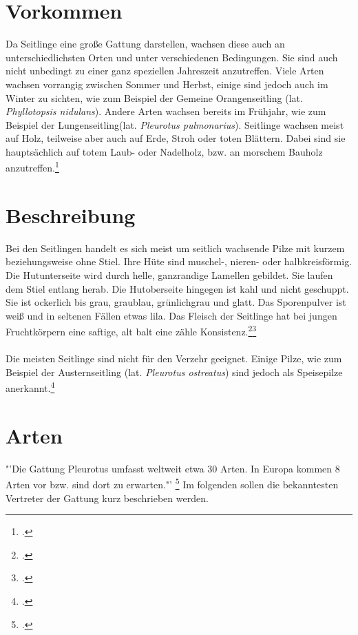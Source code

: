 \documentclass[a4paper,abstracton]{scrreprt}
\begin{document}
\section{Vorkommen}
Da Seitlinge eine große Gattung darstellen, wachsen diese auch an unterschiedlichsten Orten und unter verschiedenen Bedingungen. Sie sind auch nicht unbedingt zu einer ganz speziellen Jahreszeit anzutreffen. Viele Arten wachsen vorrangig zwischen Sommer und Herbst, einige sind jedoch auch im Winter zu sichten, wie zum Beispiel der Gemeine Orangenseitling (lat. \emph{Phyllotopsis nidulans}). Andere Arten wachsen bereits im Frühjahr, wie zum Beispiel der Lungenseitling(lat. \emph{Pleurotus pulmonarius}). Seitlinge wachsen meist auf Holz, teilweise aber auch auf Erde, Stroh oder toten Blättern. Dabei sind sie hauptsächlich auf totem Laub- oder Nadelholz, bzw. an morschem Bauholz anzutreffen.\footcite{pilzech}

\section{Beschreibung}
Bei den Seitlingen handelt es sich meist um seitlich wachsende Pilze mit kurzem beziehungsweise ohne Stiel. Ihre Hüte sind muschel-, nieren- oder halbkreisförmig. Die Hutunterseite wird durch helle, ganzrandige Lamellen gebildet. Sie laufen dem Stiel entlang herab. Die Hutoberseite hingegen ist kahl und nicht geschuppt. Sie ist ockerlich bis grau, graublau, grünlichgrau und glatt. Das Sporenpulver ist weiß und in seltenen Fällen etwas lila. Das Fleisch der Seitlinge hat bei jungen Fruchtkörpern eine saftige, alt balt eine zähle Konsistenz.\footcite{faktenuber}\footcite{pilzech}\\
\\Die meisten Seitlinge sind nicht für den Verzehr geeignet. Einige Pilze, wie zum Beispiel der Austernseitling (lat. \emph{Pleurotus ostreatus}) sind jedoch als Speisepilze anerkannt.\footcite{pg_austernseitling}

\section{Arten}
"'Die Gattung Pleurotus umfasst weltweit etwa 30 Arten. In Europa kommen 8 Arten vor bzw. sind dort zu erwarten."' \footcite{faktenuber} Im folgenden sollen die bekanntesten Vertreter der Gattung kurz beschrieben werden.
\end{document}
